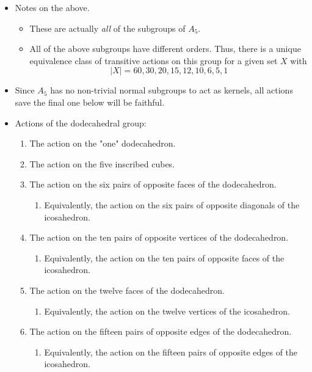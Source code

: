 \documentclass[../notes.tex]{subfiles}
\begin{document}
\begin{itemize}
    \item Notes on the above.
    \begin{itemize}
        \item These are actually \emph{all} of the subgroups of $A_5$.
        \item All of the above subgroups have different orders. Thus, there is a unique equivalence class of transitive actions on this group for a given set $X$ with
        \begin{equation*}
            |X| = 60,30,20,15,12,10,6,5,1
        \end{equation*}
    \end{itemize}
    \item Since $A_5$ has no non-trivial normal subgroups to act as kernels, all actions save the final one below will be faithful.
    \item Actions of the dodecahedral group:
    \begin{enumerate}
        \item The action on the "one" dodecahedron.
        \item The action on the five inscribed cubes.
        \item The action on the six pairs of opposite faces of the dodecahedron.
        \begin{enumerate}
            \item Equivalently, the action on the six pairs of opposite diagonals of the icosahedron.
        \end{enumerate}
        \item The action on the ten pairs of opposite vertices of the dodecahedron.
        \begin{enumerate}
            \item Equivalently, the action on the ten pairs of opposite faces of the icosahedron.
        \end{enumerate}
        \item The action on the twelve faces of the dodecahedron.
        \begin{enumerate}
            \item Equivalently, the action on the twelve vertices of the icosahedron.
        \end{enumerate}
        \item The action on the fifteen pairs of opposite edges of the dodecahedron.
        \begin{enumerate}
            \item Equivalently, the action on the fifteen pairs of opposite edges of the icosahedron.

\end{enumerate}
\end{enumerate}
\end{itemize}
\end{document}
